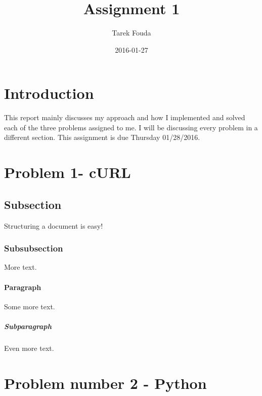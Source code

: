 \documentclass{article}
\title{Assignment 1}
\date{2016-01-27}
\author{Tarek Fouda}
\begin{document}
  \maketitle
\section{Introduction}
This report mainly discusses my approach and how I implemented and solved each of the three problems assigned to me. I will be discussing every problem in a different section. This assignment is due Thursday 01/28/2016.

\section{Problem 1- cURL}

\subsection{Subsection}

Structuring a document is easy!

\subsubsection{Subsubsection}

More text.

\paragraph{Paragraph}

Some more text.

\subparagraph{Subparagraph}

Even more text.

\section{Problem number 2 - Python}
\end{document}
